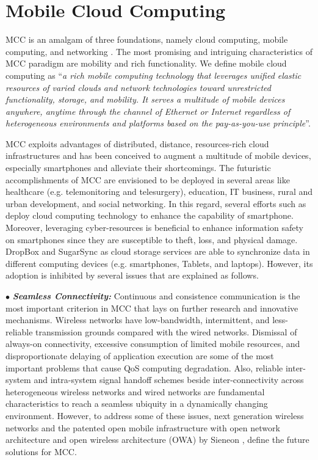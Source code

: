 \documentclass[conference]{IEEEtran}
\begin{document}
\section{Mobile Cloud Computing}
MCC is an amalgam of three foundations, namely cloud computing, mobile computing, and networking \cite{ZohrehSanaei2012}. The most promising and intriguing characteristics of MCC paradigm are mobility and rich functionality. We define mobile cloud computing as ``\textit{a rich mobile computing technology that leverages unified elastic resources of varied clouds and network technologies toward unrestricted functionality, storage, and mobility. It serves a multitude of mobile devices anywhere, anytime through the channel of Ethernet or Internet regardless of heterogeneous environments and platforms based on the pay-as-you-use principle}''.

MCC exploits advantages of distributed, distance, resources-rich cloud infrastructures and has been conceived to augment a multitude of mobile devices, especially smartphones and alleviate their shortcomings. The futuristic accomplishments of MCC are envisioned to be deployed in several areas like healthcare (e.g. telemonitoring and telesurgery), education, IT business, rural and urban development, and social networking. In this regard, several efforts such as \cite{cuervo2010maui,Zhang2011a,Chun2009,March2011,Lu2011,Kemp2010a} deploy cloud computing technology to enhance the capability of smartphone. Moreover, leveraging cyber-resources is beneficial to enhance information safety on smartphones since they are susceptible to theft, loss, and physical damage. DropBox and SugarSync \cite{sugarsync} as cloud storage services are able to synchronize data in different computing devices (e.g. smartphones, Tablets, and laptops). However, its adoption is inhibited by several issues that are explained as follows.
 
\indent $\bullet$ \textit{\textbf{Seamless Connectivity:}} Continuous and consistence communication is the most important criterion in MCC that lays on further research and innovative mechanisms. Wireless networks have low-bandwidth, intermittent, and less-reliable transmission grounds compared with the wired networks. Dismissal of always-on connectivity, excessive consumption of limited mobile resources, and disproportionate delaying of application execution are some of the most important problems that cause QoS computing degradation. Also, reliable inter-system and intra-system signal handoff schemes beside inter-connectivity across heterogeneous wireless networks and wired networks are fundamental characteristics to reach a seamless ubiquity in a dynamically changing environment. However, to address some of these issues, next generation wireless networks \cite{Nasser2006} and the patented open mobile infrastructure with open network architecture and open wireless architecture (OWA) by Sieneon \cite{sieneon}, define the future solutions for MCC.
\end{document}
